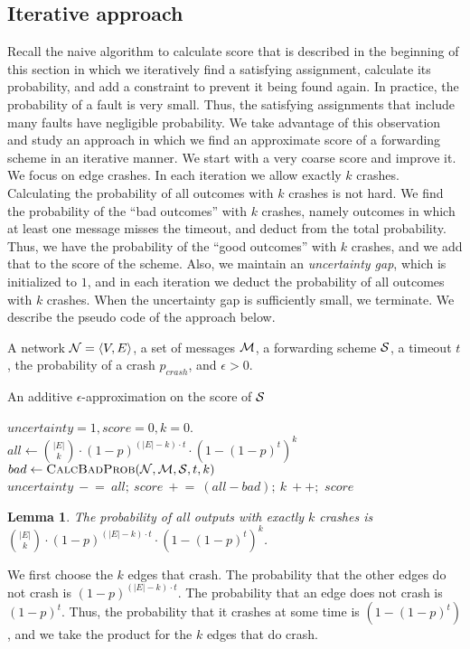 \documentclass[11pt,eepic]{article}
\newcommand{\zug}[1]{\langle #1  \rangle}
\newcommand{\N}{{\cal N}}
\newcommand{\M}{{\cal M}}
\renewcommand{\S}{{\cal S}}
\newtheorem{lemma}[theorem]{Lemma}
\def\eod{\vrule height 6pt width 5pt depth 0pt}
\newenvironment{proof}{\noindent {\bf Proof:} \hspace{.677em}}
	                      {\hspace*{\fill}{\eod}}
\begin{document}
	\subsection{Iterative approach}
		\label{sec:Iterative}
		Recall the naive algorithm to calculate score that is described in the beginning of this section in which we iteratively find a satisfying assignment, calculate its probability, and add a constraint to prevent it being found again. In practice, the probability of a fault is very small. Thus, the satisfying assignments that include many faults have negligible probability. We take advantage of this observation and study an approach in which we find an approximate score of a forwarding scheme in an iterative manner. We start with a very coarse score and improve it. We focus on edge crashes. In each iteration we allow exactly $k$ crashes. Calculating the probability of all outcomes with $k$ crashes is not hard. We find the probability of the ``bad outcomes'' with $k$ crashes, namely outcomes in which at least one message misses the timeout, and deduct from the total probability. Thus, we have the probability of the ``good outcomes'' with $k$ crashes, and we add that to the score of the scheme. Also, we maintain an {\em uncertainty gap}, which is initialized to $1$, and in each iteration we deduct the probability of all outcomes with $k$ crashes. When the uncertainty gap is sufficiently small, we terminate. We describe the pseudo code of the approach below.


		\begin{center}
		\begin{algorithmic}
		\Require A network $\N=\zug{V, E}$, a set of messages $\M$, a forwarding scheme $\S$, a timeout $t$, the probability of a crash $p_{crash}$, and $\epsilon > 0$.

		\Ensure An additive $\epsilon$-approximation on the score of $\S$

		\State $uncertainty = 1, score=0, k=0$.
		\State $all \gets {|E| \choose k} \cdot (1-p)^{(|E|-k) \cdot t} \cdot (1 - (1-p)^t)^k$
		\State $bad \gets \Call{CalcBadProb}{\N, \M, \S, t, k}$
		\State $uncertainty \ -\!= \ all; \ score \ +\!= \  (all-bad);\ k\ +\!+;$
		\EndWhile
		\State \Return $score$
		\end{algorithmic}
		\end{center}

		\begin{lemma}
		\label{lem:calc-prob}
		The probability of all outputs with exactly $k$ crashes is ${|E| \choose k} \cdot (1-p)^{(|E|-k) \cdot t} \cdot (1 - (1-p)^t)^k$.
		\end{lemma}
		\begin{proof}
		We first choose the $k$ edges that crash. The probability that the other edges do not crash is $(1-p)^{(|E|-k) \cdot t}$. The probability that an edge does not crash is $(1-p)^t$. Thus, the probability that it crashes at some time is $(1-(1-p)^t)$, and we take the product for the $k$ edges that do crash.
		\end{proof}
\end{document}
